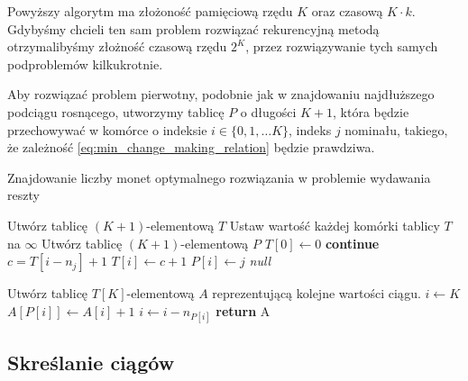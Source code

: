 Powyższy algorytm ma złożoność pamięciową rzędu $K$ oraz czasową $K\cdot k$. 
Gdybyśmy chcieli ten sam problem rozwiązać rekurencyjną metodą otrzymalibyśmy
złożność czasową rzędu $2^K$, przez rozwiązywanie tych samych podproblemów kilkukrotnie.

Aby rozwiązać problem pierwotny, podobnie jak w znajdowaniu najdłuższego
podciągu rosnącego, utworzymy tablicę $P$ o długości $K+1$,
która będzie przechowywać w komórce o indeksie $i \in \{0, 1, \ldots K\}$, indeks $j$
nominału, takiego, że zależność \eqref{eq:min_change_making_relation}
będzie prawdziwa.

\begin{algorithm}[H]
	\caption{Znajdowanie liczby monet optymalnego 
		rozwiązania w problemie wydawania reszty}\label{ChangeMaking}
	\begin{algorithmic}[1]
		\State Utwórz tablicę $(K+1)$-elementową $T$
		\State Ustaw wartość każdej komórki tablicy $T$ na $\infty$
		\State Utwórz tablicę $(K+1)$-elementową $P$
		\State $T[0] \gets 0$
		  \textbf{continue}
		\EndIf
		\State $c = T[i - n_j] + 1$
		\State $T[i] \gets c + 1$
		\State $P[i] \gets j$
		\EndIf
		\EndFor
		\EndFor
		 \Return \textit{null}
		\EndIf
		
		\State Utwórz tablicę $T[K]$-elementową $A$ reprezentującą
		kolejne wartości ciągu.
		\State $i \gets K$
		\State $A[P[i]] \gets A[i] + 1$
		\State $i \gets i - n_{P[i]}$
		\EndWhile
		\State \textbf{return} A
		\EndProcedure
	\end{algorithmic}
\end{algorithm}

\subsection{Skreślanie ciągów}